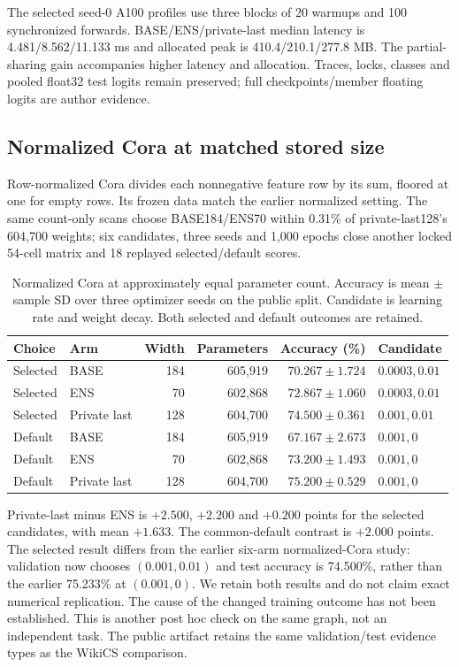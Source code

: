 The selected seed-0 A100 profiles use three blocks of 20 warmups and 100 synchronized forwards. BASE/ENS/private-last median latency is 4.481/8.562/11.133 ms and allocated peak is 410.4/210.1/277.8 MB. The partial-sharing gain accompanies higher latency and allocation. Traces, locks, classes and pooled float32 test logits remain preserved; full checkpoints/member floating logits are author evidence.

\subsection{Normalized Cora at matched stored size}
Row-normalized Cora divides each nonnegative feature row by its sum, floored at one for empty rows. Its frozen data match the earlier normalized setting. The same count-only scans choose BASE184/ENS70 within 0.31\% of private-last128's 604,700 weights; six candidates, three seeds and 1,000 epochs close another locked 54-cell matrix and 18 replayed selected/default scores.

\begin{table}[t]
\centering\small
\setlength{\tabcolsep}{4pt}
\caption{Normalized Cora at approximately equal parameter count. Accuracy is mean $\pm$ sample SD over three optimizer seeds on the public split. Candidate is learning rate and weight decay. Both selected and default outcomes are retained.}
\label{tab:cora-matched-budget}
\begin{tabular}{llrrrl}
\toprule
Choice & Arm & Width & Parameters & Accuracy (\%) & Candidate\\
\midrule
Selected & BASE & 184 & 605,919 & $70.267 \pm 1.724$ & $0.0003, 0.01$\\
Selected & ENS & 70 & 602,868 & $72.867 \pm 1.060$ & $0.0003, 0.01$\\
Selected & Private last & 128 & 604,700 & $74.500 \pm 0.361$ & $0.001, 0.01$\\
Default & BASE & 184 & 605,919 & $67.167 \pm 2.673$ & $0.001, 0$\\
Default & ENS & 70 & 602,868 & $73.200 \pm 1.493$ & $0.001, 0$\\
Default & Private last & 128 & 604,700 & $75.200 \pm 0.529$ & $0.001, 0$\\
\bottomrule
\end{tabular}
\end{table}

Private-last minus ENS is $+2.500$, $+2.200$ and $+0.200$ points for
the selected candidates, with mean $+1.633$. The common-default
contrast is $+2.000$ points. The selected result differs from the
earlier six-arm normalized-Cora study: validation now chooses
$(0.001,0.01)$ and test accuracy is 74.500\%, rather than the earlier
75.233\% at $(0.001,0)$. We retain both results and do not claim exact
numerical replication. The cause of the changed training outcome has
not been established. This is another post hoc check on the same graph,
not an independent task. The public artifact retains the same
validation/test evidence types as the WikiCS comparison.

